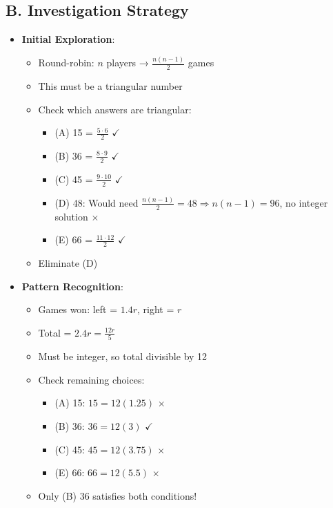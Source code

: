 \documentclass[12pt]{article}
\begin{document}
\begin{strategicbox}
\subsection*{B. Investigation Strategy}
\begin{itemize}[leftmargin=*]
    \item \textbf{Initial Exploration}: 
    \begin{itemize}
        \item Round-robin: $n$ players → $\frac{n(n-1)}{2}$ games
        \item This must be a triangular number
        \item Check which answers are triangular:
        \begin{itemize}
            \item (A) 15 = $\frac{5 \cdot 6}{2}$ $\checkmark$
            \item (B) 36 = $\frac{8 \cdot 9}{2}$ $\checkmark$
            \item (C) 45 = $\frac{9 \cdot 10}{2}$ $\checkmark$
            \item (D) 48: Would need $\frac{n(n-1)}{2} = 48 \Rightarrow n(n-1) = 96$, no integer solution $\times$
            \item (E) 66 = $\frac{11 \cdot 12}{2}$ $\checkmark$
        \end{itemize}
        \item Eliminate (D)
    \end{itemize}
    \item \textbf{Pattern Recognition}: 
    \begin{itemize}
        \item Games won: left = $1.4r$, right = $r$
        \item Total = $2.4r = \frac{12r}{5}$
        \item Must be integer, so total divisible by 12
        \item Check remaining choices:
        \begin{itemize}
            \item (A) 15: $15 = 12(1.25)$ $\times$
            \item (B) 36: $36 = 12(3)$ $\checkmark$
            \item (C) 45: $45 = 12(3.75)$ $\times$
            \item (E) 66: $66 = 12(5.5)$ $\times$
        \end{itemize}
        \item Only (B) 36 satisfies both conditions!
    \end{itemize}
\end{itemize}


\end{strategicbox}
\end{document}
